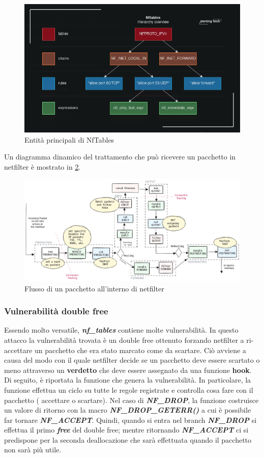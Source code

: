 \documentclass{article}
\begin{document}
\begin{figure}[h]
  \begin{center}
    \includegraphics[width=.65\textwidth]{figures/ch1/nf_tables-4.png}
  \end{center}
  \caption{Entità principali di NfTables}\label{fig:nf-tables-entity}
\end{figure}


Un diagramma dinamico del trattamento che può ricevere un pacchetto in netfilter è mostrato 
in \cref{fig:nf_flow}.

\begin{figure}[h]
  \begin{center}
    \includegraphics[width=.8\textwidth]{figures/ch1/Diagrama_linux_netfilter_iptables.png}
  \end{center}
  \caption{Flusso di un pacchetto all'interno di netfilter}\label{fig:nf_flow}
\end{figure}

\subsubsection{Vulnerabilità double free} Essendo molto versatile, \textbf{\textit{nf\_tables}} 
contiene molte vulnerabilità. In questo attacco la vulnerabilità trovata è un double free 
ottenuto forzando netfilter a ri-accettare un pacchetto che era stato marcato come da scartare. 
Ciò avviene a causa del modo con il quale netfilter decide se un pacchetto deve essere scartato o 
meno attraverso un \textbf{verdetto} che deve essere assegnato da una funzione \textbf{hook}. 
Di seguito, è riportata la funzione che genera la vulnerabilità. In particolare, la funzione 
effettua un ciclo su tutte le regole registrate e controlla cosa fare con il pacchetto (
accettare o scartare). Nel caso di \textbf{\textit{NF\_DROP}}, la funzione costruisce un 
valore di ritorno con la macro \textbf{\textit{NF\_DROP\_GETERR()}} a cui è possibile far 
tornare \textbf{\textit{NF\_ACCEPT}}. Quindi, quando si entra nel branch \textbf{\textit{NF\_DROP}}
si effettua il primo \textbf{\textit{free}} del double free; mentre ritornando \textbf{\textit{NF\_ACCEPT}}
ci si predispone per la seconda deallocazione che sarà effettuata quando il pacchetto non 
sarà più utile.
\end{document}
